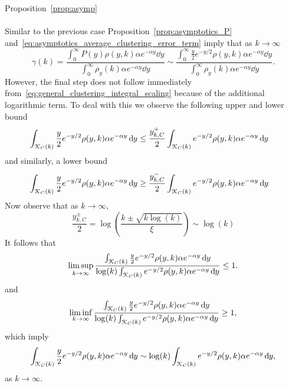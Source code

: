 \begin{proofof}{Proposition~\ref{prop:asymp}}
\paragraph{}
Similar to the previous case Proposition~\ref{prop:asymptotics_P} and~\eqref{eq:asymptotics_average_clustering_error_term} imply that as $k \to \infty$
\[
	\gamma(k) = \frac{\int_0^{\infty} P(y) \rho(y,k) \alpha  e^{-\alpha y} \dd y}
	{\int_0^\infty \rho_{y}(k) \alpha e^{-\alpha y} \dd y}
	\sim  \frac{\int_0^{\infty} \frac{y}{2} e^{-y/2} \rho(y,k) \alpha  e^{-\alpha y} \dd y}
		{\int_0^\infty \rho_{y}(k) \alpha e^{-\alpha y} \dd y}.
\]
However, the final step does not follow immediately from~\eqref{eq:general_clustering_integral_scaling} because of the additional logarithmic term. 
To deal with this we observe the following upper and lower bound
\begin{align*}
	\int_{{\mathcal K}_C(k)} \frac{y}{2} e^{-y/2} \rho(y,k) \alpha e^{-\alpha y} \operatorname{\mathrm{d}\hspace{-2pt}} y
	&\le \frac{y_{k,C}^+}{2} \int_{{\mathcal K}_C(k)} e^{-y/2} \rho(y,k) \alpha e^{-\alpha y} \operatorname{\mathrm{d}\hspace{-2pt}} y
\end{align*}
and similarly, a lower bound
\begin{align*}
	\int_{{\mathcal K}_C(k)} \frac{y}{2} e^{-y/2} \rho(y,k) \alpha e^{-\alpha y} \operatorname{\mathrm{d}\hspace{-2pt}} y
	&\ge \frac{y_{k,C}^-}{2} \int_{{\mathcal K}_C(k)} e^{-y/2} \rho(y,k) \alpha e^{-\alpha y} \operatorname{\mathrm{d}\hspace{-2pt}} y
\end{align*}
Now observe that as $k \to \infty$,
\[
	\frac{y_{k,C}^\pm}{2} = \log\left(\frac{k \pm \sqrt{k\log(k)}}{\xi}\right) \sim \log(k)
\]
It follows that
\[
	\limsup_{k \to \infty} \frac{\int_{{\mathcal K}_C(k)} \frac{y}{2} e^{-y/2} \rho(y,k) \alpha e^{-\alpha y} \operatorname{\mathrm{d}\hspace{-2pt}} y}
	{\log(k) \int_{{\mathcal K}_C(k)} e^{-y/2} \rho(y,k) \alpha e^{-\alpha y} \operatorname{\mathrm{d}\hspace{-2pt}} y} \le 1.
\]
and
\[
	\liminf_{k \to \infty} \frac{\int_{{\mathcal K}_C(k)} \frac{y}{2} e^{-y/2} \rho(y,k) \alpha e^{-\alpha y} \operatorname{\mathrm{d}\hspace{-2pt}} y}
	{\log(k) \int_{{\mathcal K}_C(k)} e^{-y/2} \rho(y,k) \alpha e^{-\alpha y} \operatorname{\mathrm{d}\hspace{-2pt}} y} \ge 1,
\]
which imply
\begin{equation}\label{eq:average_clustering_proof_34_main}
	\int_{{\mathcal K}_C(k)} \frac{y}{2} e^{-y/2} \rho(y,k) \alpha e^{-\alpha y} \operatorname{\mathrm{d}\hspace{-2pt}} y
	\sim \log(k) \int_{{\mathcal K}_C(k)} e^{-y/2} \rho(y,k) \alpha e^{-\alpha y} \operatorname{\mathrm{d}\hspace{-2pt}} y,
\end{equation}
as $k \to \infty$.


\end{proofof}
